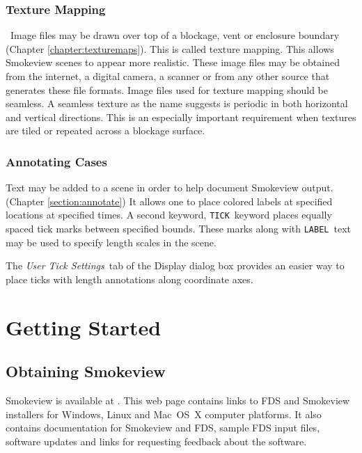 \documentclass[11pt,twoside]{book}
\begin{document}
\subsubsection{Texture Mapping}\ Image files may be drawn over top
of a blockage, vent or enclosure boundary (Chapter
\ref{chapter:texturemaps}). This is called texture mapping.  This
allows Smokeview scenes to appear more realistic. These image
files may be obtained from the internet, a digital camera, a
scanner or from any other source that generates these file
formats. Image files used for texture mapping should be seamless.
A seamless texture as the name suggests is periodic in both
horizontal and vertical directions. This is an especially
important requirement when textures are tiled or repeated across a
blockage surface.

\subsubsection{Annotating Cases}Text may be added to a scene in order to help document Smokeview
output. (Chapter \ref{section:annotate}) It allows one to place
colored labels at specified locations at specified times. A second
keyword, {\tt TICK}\ keyword places equally spaced tick marks
between specified bounds. These marks along with {\tt LABEL}\ text
may be used to specify length scales in the scene.

The {\em User Tick Settings}\ tab of the Display dialog box
provides an easier way to place ticks with length annotations
along coordinate axes.



\section{Getting Started}

\subsection{Obtaining Smokeview}

Smokeview is available at .
This web page contains links to FDS and Smokeview installers for
Windows, Linux and Mac~OS~X computer platforms. It also contains documentation for
Smokeview and FDS, sample FDS input files, software updates and
links for requesting feedback about the software.
\end{document}
